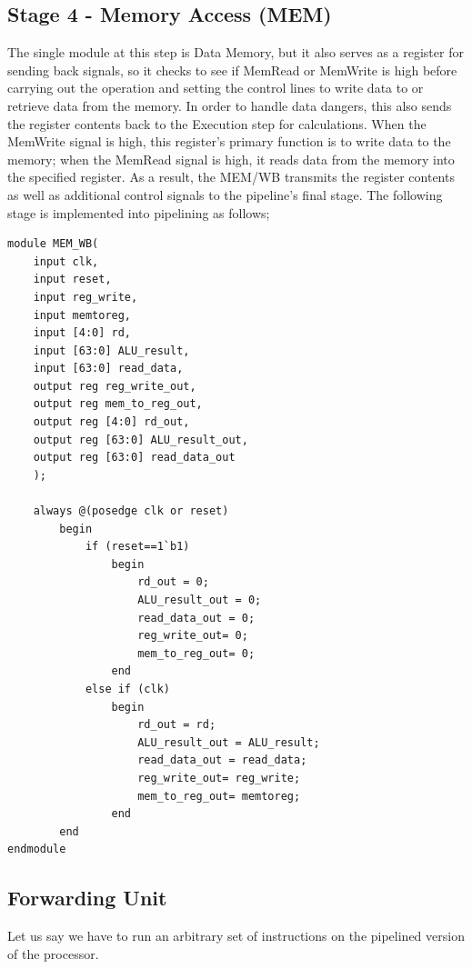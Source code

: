 \documentclass{article}
\begin{document}
\subsection*{Stage 4 - Memory Access (MEM)}

The single module at this step is Data Memory, but it also serves as a register for sending back signals, so it checks to see if MemRead or MemWrite is high before carrying out the operation and setting the control lines to write data to or retrieve data from the memory. In order to handle data dangers, this also sends the register contents back to the Execution step for calculations. When the MemWrite signal is high, this register's primary function is to write data to the memory; when the MemRead signal is high, it reads data from the memory into the specified register. As a result, the MEM/WB transmits the register contents as well as additional control signals to the pipeline's final stage. The following stage is implemented into pipelining as follows;

\begin{lstlisting}[caption={MEM/WB Register}, captionpos=b, language=RISC-V]
module MEM_WB(
    input clk,
    input reset,
    input reg_write,
    input memtoreg,
    input [4:0] rd,
    input [63:0] ALU_result,
    input [63:0] read_data,
    output reg reg_write_out,
    output reg mem_to_reg_out,
    output reg [4:0] rd_out,
    output reg [63:0] ALU_result_out,
    output reg [63:0] read_data_out 
    );
       
    always @(posedge clk or reset)
        begin
            if (reset==1`b1)
                begin
                    rd_out = 0;
                    ALU_result_out = 0;
                    read_data_out = 0;
                    reg_write_out= 0;
                    mem_to_reg_out= 0;            	
                end
            else if (clk)
                begin
                    rd_out = rd;
                    ALU_result_out = ALU_result;
                    read_data_out = read_data;
                    reg_write_out= reg_write;
                    mem_to_reg_out= memtoreg;            	
                end
        end        
endmodule
\end{lstlisting}

\subsection*{Forwarding Unit}
Let us say we have to run an arbitrary set of instructions on the pipelined version of the processor. 
\end{document}
